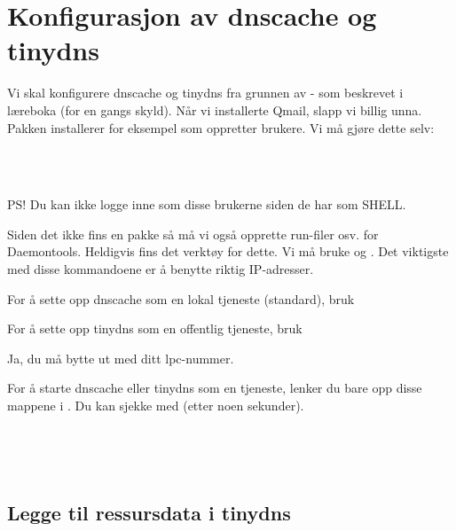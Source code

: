 \section{Konfigurasjon av dnscache og tinydns}



Vi skal konfigurere dnscache og tinydns fra grunnen av - som beskrevet i læreboka (for en gangs skyld).
Når vi installerte Qmail, slapp vi billig unna. Pakken  installerer for eksempel 
 som oppretter brukere. Vi må gjøre dette selv:

\\
\\

PS! Du kan ikke logge inne som disse brukerne siden de har  som SHELL. 

Siden det ikke fins en  pakke så må vi også opprette run-filer osv. for Daemontools.
Heldigvis fins det verktøy for dette. Vi må bruke  og .
Det viktigste med disse kommandoene er å benytte riktig IP-adresser.

For å sette opp dnscache som en lokal tjeneste (standard), bruk


For å sette opp tinydns som en offentlig tjeneste, bruk


Ja, du må bytte ut  med ditt lpc-nummer.
 
For å starte dnscache eller tinydns som en tjeneste, lenker 
du bare opp disse mappene i .
Du kan sjekke med  (etter noen sekunder).

\\

\\

\subsection{Legge til ressursdata i tinydns}

